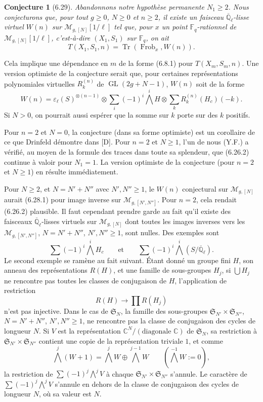 \documentclass[10pt]{article}
\newcommand{\Fq}{\mathbb F_q}
\newcommand{\Ql}{\overline{\mathbb Q}_{\ell}}
\newcommand{\C}{\mathbb C}
\newcommand{\GL}{\operatorname{GL}}
\newcommand{\Frob}{\operatorname{Frob}}
\newcommand{\Tr}{\operatorname{Tr}}
\theoremstyle{deligne}
\newtheorem*{conjecture*}{Conjecture}
\begin{document}
\begin{conjecture*}[6.29]
Abandonnons notre hypothèse permanente $N_1\ge2$. Nous conjecturons que, pour tout $g\ge0$, $N\ge0$ et $n\ge2$, il existe un faisceau $\Ql$-lisse virtuel $W(n)$ sur $\mathcal M_{g,[N]}[1/\ell]$ tel que, pour $x$ un point $\Fq$-rationnel de $\mathcal M_{g,[N]}[1/\ell]$, c'est-à-dire $(X_1,S_1)$ sur $\Fq$, on ait
\[
T(X_1,S_1,n)=\Tr(\Frob_x,W(n)).
\]
\end{conjecture*}
Cela implique une dépendance en $m$ de la forme (6.8.1) pour $T(X_m,S_m,n)$. Une version optimiste de la conjecture serait que, pour certaines représentations polynomiales virtuelles $R_k^{(n)}$ de $\GL(2g+N-1)$, $W(n)$ soit de la forme
\[
W(n)=\varepsilon_\ell(S)^{\otimes(n-1)}\otimes\sum_i(-1)^i\bigwedge^iH\otimes\sum_k R_k^{(n)}(H_c)(-k).
\]
Si $N>0$, on pourrait aussi espérer que la somme sur $k$ porte sur des $k$ positifs.

Pour $n=2$ et $N=0$, la conjecture (dans sa forme optimiste) est un corollaire de ce que Drinfeld démontre dans [D]. Pour $n=2$ et $N\ge1$, l'un de nous (Y.F.) a vérifié, au moyen de la formule des traces dans toute sa splendeur, que (6.26.2) continue à valoir pour $N_1=1$. La version optimiste de la conjecture (pour $n=2$ et $N\ge1$) en résulte immédiatement.

Pour $N\ge2$, et $N=N'+N''$ avec $N',N''\ge1$, le $W(n)$ conjectural sur $\mathcal M_{g,[N]}$ aurait (6.28.1) pour image inverse sur $\mathcal M_{g,[N',N'']}$. Pour $n=2$, cela rendait (6.26.2) plausible. Il faut cependant prendre garde au fait qu'il existe des faisceaux $\Ql$-lisses virtuels sur $\mathcal M_{g,[N]}$ dont toutes les images inverses vers les $\mathcal M_{g,[N',N'']}$, $N=N'+N''$, $N',N''\ge1$, sont nulles. Des exemples sont
\[
\sum(-1)^i\bigwedge^iH_c\qquad\text{et}\qquad \sum(-1)^i\bigwedge^i(S/\Ql).
\]
Le second exemple se ramène au fait suivant. Étant donné un groupe fini $H$, son anneau des représentations $R(H)$, et une famille de sous-groupes $H_j$, si $\bigcup H_j$ ne rencontre pas toutes les classes de conjugaison de $H$, l'application de restriction
\[
R(H)\longrightarrow\prod R(H_j)
\]
n'est pas injective. Dans le cas de $\mathfrak S_N$, la famille des sous-groupes $\mathfrak S_{N'}\times\mathfrak S_{N''}$, $N=N'+N''$, $N',N''\ge1$, ne rencontre pas la classe de conjugaison des cycles de longueur $N$. Si $V$ est la représentation $\C^N/(\text{diagonale }\C)$ de $\mathfrak S_N$, sa restriction à $\mathfrak S_{N'}\times\mathfrak S_{N''}$ contient une copie de la représentation triviale $1$, et comme
\[
\bigwedge^j(W+1)=\bigwedge^jW\oplus\bigwedge^{j-1}W\qquad(\bigwedge^{-1}W:=0),
\]
la restriction de $\sum(-1)^j\bigwedge^jV$ à chaque $\mathfrak S_{N'}\times\mathfrak S_{N''}$ s'annule. Le caractère de $\sum(-1)^j\bigwedge^jV$ s'annule en dehors de la classe de conjugaison des cycles de longueur $N$, où sa valeur est $N$.
\end{document}
